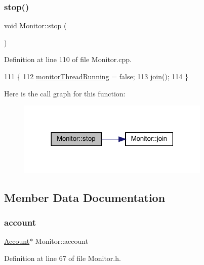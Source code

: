 \subsubsection{\texorpdfstring{stop()}{stop()}}
{\footnotesize\ttfamily void Monitor\+::stop (\begin{DoxyParamCaption}{ }\end{DoxyParamCaption})}



Definition at line 110 of file Monitor.\+cpp.


\begin{DoxyCode}
111 \{
112     \hyperlink{class_monitor_a63d26dffb146b9cfd0705163f3dc4745}{monitorThreadRunning} = \textcolor{keyword}{false};
113     \hyperlink{class_monitor_a2d2e309666c98333a317c9786f94f6ad}{join}();
114 \}
\end{DoxyCode}
Here is the call graph for this function\+:
\nopagebreak
\begin{figure}[H]
\begin{center}
\leavevmode
\includegraphics[width=260pt]{d9/df7/class_monitor_a13fb20dc3bd5c8739f5a820cf7433cd8_cgraph}
\end{center}
\end{figure}


\subsection{Member Data Documentation}
\mbox{\label{class_monitor_acacff99178fbcd9eae50801acc346bf4}} 
\subsubsection{\texorpdfstring{account}{account}}
{\footnotesize\ttfamily \hyperlink{class_account}{Account}$\ast$ Monitor\+::account\hspace{0.3cm}{\ttfamily [private]}}



Definition at line 67 of file Monitor.\+h.

